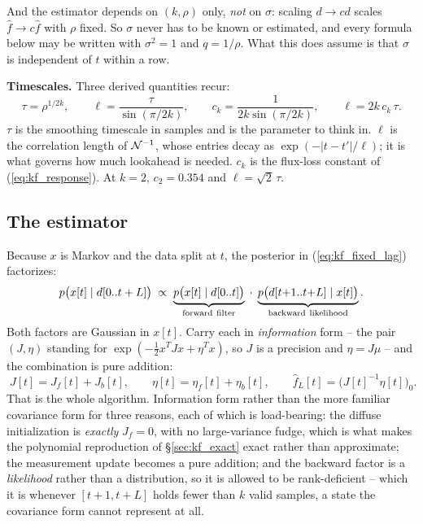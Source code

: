 \documentclass{article}
\numberwithin{equation}{section}   %
\begin{document}
And the estimator depends on $(k,\rho)$ only, {\em not} on $\sigma$: scaling $d \rightarrow cd$ scales
$\hat f \rightarrow c\hat f$ with $\rho$ fixed.  So $\sigma$ never has to be known or estimated, and every
formula below may be written with $\sigma^2 = 1$ and $q = 1/\rho$.  What this does assume is that $\sigma$ is
independent of $t$ within a row.

{\bf Timescales.}  Three derived quantities recur:
\begin{equation}
\tau = \rho^{1/2k}, \qquad
\ell = \frac{\tau}{\sin(\pi/2k)}, \qquad
c_k = \frac{1}{2k \sin(\pi/2k)} , \qquad \ell = 2k\,c_k\,\tau .
\label{eq:kf_scales}
\end{equation}
$\tau$ is the smoothing timescale in samples and is the parameter to think in.  $\ell$ is the correlation
length of ${\cal N}^{-1}$, whose entries decay as $\exp(-|t-t'|/\ell)$; it is what governs how much lookahead
is needed.  $c_k$ is the flux-loss constant of (\ref{eq:kf_response}).  At $k=2$, $c_2 = 0.354$ and
$\ell = \sqrt2\,\tau$.

\subsection{The estimator}
\label{sec:kf_estimator}

Because $x$ is Markov and the data split at $t$, the posterior in (\ref{eq:kf_fixed_lag}) factorizes:
\begin{equation}
p\big(x[t] \mid d[0..t+L]\big) \;\propto\;
  \underbrace{p\big(x[t] \mid d[0..t]\big)}_{\rm forward\ filter} \;\cdot\;
  \underbrace{p\big(d[t{+}1..t{+}L] \mid x[t]\big)}_{\rm backward\ likelihood} .
\label{eq:kf_split}
\end{equation}
Both factors are Gaussian in $x[t]$.  Carry each in {\em information} form -- the pair $(J,\eta)$ standing for
$\exp(-\frac12 x^TJx + \eta^Tx)$, so $J$ is a precision and $\eta = J\mu$ -- and the combination is pure
addition:
\begin{equation}
\boxed{\;J[t] = J_f[t] + J_b[t], \qquad \eta[t] = \eta_f[t] + \eta_b[t], \qquad
\hat f_L[t] = \big(J[t]^{-1}\eta[t]\big)_0 . \;}
\label{eq:kf_combine}
\end{equation}
That is the whole algorithm.  Information form rather than the more familiar covariance form for three
reasons, each of which is load-bearing: the diffuse initialization is {\em exactly} $J_f = 0$, with no
large-variance fudge, which is what makes the polynomial reproduction of \S\ref{sec:kf_exact} exact rather
than approximate; the measurement update becomes a pure addition; and the backward factor is a
{\em likelihood} rather than a distribution, so it is allowed to be rank-deficient -- which it is whenever
$[t{+}1, t{+}L]$ holds fewer than $k$ valid samples, a state the covariance form cannot represent at all.
\end{document}
